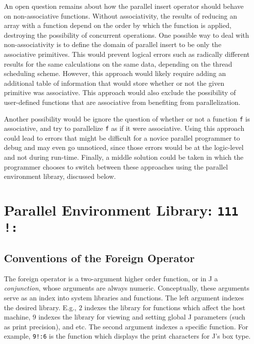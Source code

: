 An open question remains about how the parallel insert operator should behave on non-associative functions. 
Without associativity, the results of reducing an array with a function depend on the order by which the function is applied, 
destroying the possibility of concurrent operations.
One possible way to deal with non-associativity is to define the domain of parallel insert to be only the associative primitives. 
This would prevent logical errors such as radically different results for the same calculations on the same data, 
depending on the thread scheduling scheme. 
However, this approach would likely require adding an additional table of information 
that would store whether or not the given primitive was associative.
This approach would also exclude the possibility of 
user-defined functions that are associative from benefiting from parallelization. 

Another possibility would be ignore the question of whether or not a function \texttt{f} is associative, 
and try to parallelize \texttt{f} as if it were associative.
Using this approach could lead to errors that might be difficult for a novice parallel programmer to debug and may even go unnoticed, 
since those errors would be at the logic-level and not during run-time.
Finally, a middle solution could be taken in which the programmer chooses to switch between these approaches using the parallel environment library, 
discussed below.

\section{Parallel Environment Library: \texttt{111 !:}} 
\label{pfor}

\subsection{Conventions of the Foreign Operator}
The foreign operator is a two-argument higher order function, or in J a \textit{conjunction}, 
whose arguments are always numeric.
Conceptually, these arguments serve as an index into system libraries and functions.
The left argument indexes the desired library.
E.g., $2$ indexes the library for functions which affect the host machine, 
$9$ indexes the library for viewing and setting global J parameters (such as print precision), and etc.
The second argument indexes a specific function.
For example, \texttt{9!:6}  is the function which displays the print characters for J's box type.

